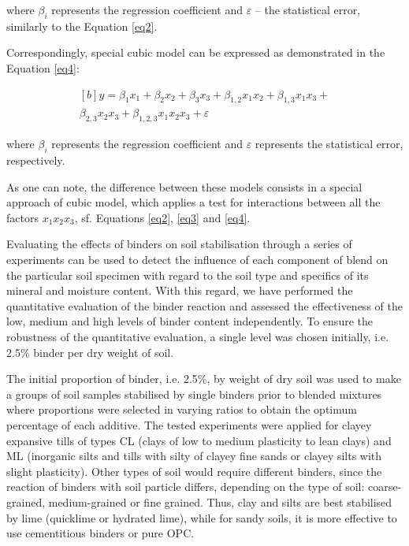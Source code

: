 \documentclass[eprint,
]{actapoly}
\begin{document}
where $\beta_i$ represents the regression coefficient and $\varepsilon$ -- the statistical error, similarly to the Equation \ref{eq2}.

Correspondingly, special cubic model can be expressed as demonstrated in the Equation \ref{eq4}:

\begin{equation}\label{eq4}
\begin{aligned}[b]
y=\beta_{1}x_{1}+\beta_{2}x_{2}+\beta_{3}x_{3}+\beta_{1,2}x_{1}x_{2}+\beta_{1,3}x_{1}x_{3}+\\\beta_{2,3}x_{2}x_{3}+\beta_{1,2,3}x_{1}x_{2}x_{3}+\varepsilon
\end{aligned}
\end{equation}

where $\beta_i$ represents the regression coefficient and $\varepsilon$ represents the statistical error, respectively. 

As one can note, the difference between these models consists in a special approach of cubic model, which applies a test for interactions between all the factors $x_{1}x_{2}x_{3}$, sf. Equations \ref{eq2}, \ref{eq3} and \ref{eq4}.

Evaluating the effects of binders on soil stabilisation through a series of experiments can be used to detect the influence of each component of blend on the particular soil specimen with regard to the soil type and specifics of its mineral and moisture content. With this regard, we have performed the quantitative evaluation of the binder reaction and assessed the effectiveness of the low, medium and high levels of binder content independently. To ensure the robustness of the quantitative evaluation, a single level was chosen initially, i.e. 2.5\% binder per dry weight of soil. 

The initial proportion of binder, i.e. 2.5\%, by weight of dry soil was used to make a groups of soil samples stabilised by single binders prior to blended mixtures where proportions were selected in varying ratios to obtain the optimum percentage of each additive. The tested experiments were applied for clayey expansive tills of types CL (clays of low to medium plasticity to lean clays) and ML (inorganic silts and tills with silty of clayey fine sands or clayey silts with slight plasticity). Other types of soil would require different binders, since the reaction of binders with soil particle differs, depending on the type of soil: coarse-grained, medium-grained or fine grained. Thus, clay and silts are best stabilised by lime (quicklime or hydrated lime), while for sandy soils, it is more effective to use cementitious binders or pure OPC.
\end{document}
